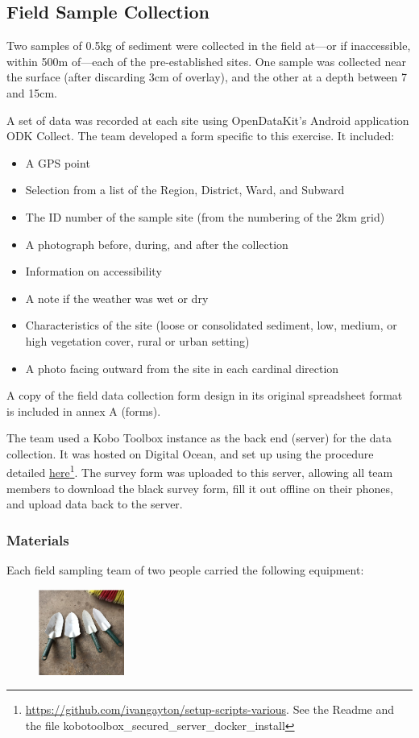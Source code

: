 \documentclass[a4paper,12pt,twoside]{article}
\begin{document}
\subsection{Field Sample Collection}
\label{fieldsamplecollection}
\color{RHgrey}
Two samples of 0.5kg of sediment were collected in the field at---or if inaccessible, within 500m of---each of the pre-established sites. One sample was collected near the surface (after discarding 3cm of overlay), and the other at a depth between 7 and 15cm.

A set of data was recorded at each site using OpenDataKit's Android application ODK Collect. The team developed a form specific to this exercise. It included:
\begin{itemize}
  \item A GPS point
  \item Selection from a list of the Region, District, Ward, and Subward
  \item The ID number of the sample site (from the numbering of the 2km grid)
  \item A photograph before, during, and after the collection
  \item Information on accessibility
  \item A note if the weather was wet or dry
  \item Characteristics of the site (loose or consolidated sediment, low, medium, or high vegetation cover, rural or urban setting)
  \item A photo facing outward from the site in each cardinal direction
\end{itemize}

A copy of the field data collection form design in its original spreadsheet format is included in annex A (forms).

The team used a Kobo Toolbox instance as the back end (server) for the data collection. It was hosted on Digital Ocean, and set up using the procedure detailed \href{https://github.com/ivangayton/setup-scripts-various}{here}\footnote{\url {https://github.com/ivangayton/setup-scripts-various}. \color{RHgrey}See the Readme and the file kobotoolbox\_secured\_server\_docker\_install}. The survey form was uploaded to this server, allowing all team members to download the black survey form, fill it out offline on their phones, and upload data back to the server. 

\newpage
\color{RHblue}
\subsubsection{Materials}
\color{RHgrey}
Each field sampling team of two people carried the following equipment:
\begin{figure}
  \centering
  \includegraphics[width=0.25\textwidth]{trowels.png}
\end{figure}
\end{document}
